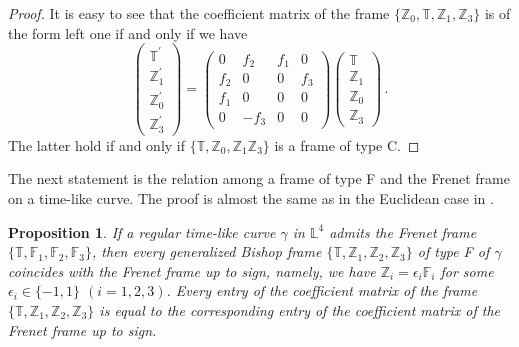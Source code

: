 \documentclass[a4paper]{amsart}
\newtheorem{proposition}[theorem]{Proposition}
\theoremstyle{definition}
\theoremstyle{remark}
\newcommand{\FF}{\mathbb{F}}
\newcommand{\TT}{\mathbb{T}}
\newcommand{\ZZ}{\mathbb{Z}}
\newcommand{\LL}{\mathbb{L}}
\numberwithin{equation}{section}
\begin{document}
\begin{proof}
It is easy to see that the coefficient matrix of the frame $\{\ZZ_{0}, \TT, \ZZ_{1}, \ZZ_{3}\}$ is of the form left one if and only if we have
\[
\begin{pmatrix}
\mathbb{T}^{\prime}\\
\ZZ_{1}^{\prime}\\
\ZZ_{0}^{\prime}\\
\ZZ_{3}^{\prime}
\end{pmatrix}=\begin{pmatrix}
0&f_{2}&f_{1}&0\\
f_{2}&0&0&f_{3}\\
f_{1}&0&0&0\\
0&-f_{3}&0&0
\end{pmatrix}\begin{pmatrix}
\mathbb{T}\\
\ZZ_{1}\\
\ZZ_{0}\\
\ZZ_{3}
\end{pmatrix}\,.
\]
The latter hold if and only if $\{\TT,\ZZ_{0},\ZZ_{1}\ZZ_{3}\}$ is a frame of type C.
\end{proof}

The next statement is the relation among a frame of type F and the Frenet frame on a time-like curve. The proof is almost the same as in the Euclidean case in \cite{NN}.

\begin{proposition}\label{prop:FFrenet}
If a regular time-like curve $\gamma$ in $\LL^4$ admits the Frenet frame $\{\TT, \FF_1, \FF_2, \FF_3\}$, then every generalized Bishop frame $\{\TT, \ZZ_1, \ZZ_2, \ZZ_3\}$ of type F of $\gamma$ coincides with the Frenet frame up to sign, namely, we have $\ZZ_i = \epsilon_i \FF_i$ for some $\epsilon_i \in \{-1,1\}$ $(i=1,2,3)$. Every entry of the coefficient matrix of the frame $\{\TT, \ZZ_1, \ZZ_2, \ZZ_3\}$ is equal to the corresponding entry of the coefficient matrix of the Frenet frame up to sign. 
\end{proposition}
\end{document}
